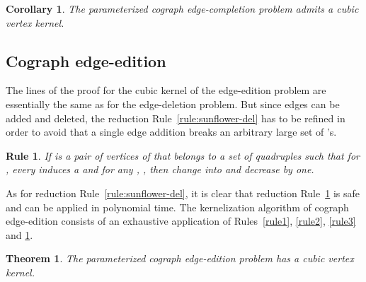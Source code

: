 \documentclass[11pt]{article}
\newtheorem{theorem}[lemma]{Theorem}
\newtheorem{corollary}[lemma]{Corollary}
\newtheorem{reduction}{Rule}
\begin{document}
 \begin{corollary}
The parameterized cograph edge-completion problem admits a cubic vertex kernel.
\end{corollary}

\subsection{Cograph edge-edition}

The lines of the proof for the cubic kernel of the edge-edition problem are essentially the same as for the edge-deletion problem. But since edges can be added and deleted, the reduction Rule~\ref{rule:sunflower-del} has to be refined in order to avoid that a single edge addition breaks an arbitrary large set of 's.

\begin{reduction} \label{rule:sunflower-edition}
If  is a pair of vertices of  that belongs to a set  of   quadruples  such that for , every  induces a  and for any , , then change  into  and decrease  by one.
\end{reduction}

As for reduction Rule~\ref{rule:sunflower-del}, it is clear that reduction Rule~\ref{rule:sunflower-edition} is safe and can be applied in polynomial time. The kernelization algorithm of cograph edge-edition consists of an exhaustive application of Rules~\ref{rule1}, \ref{rule2}, \ref{rule3} and \ref{rule:sunflower-edition}.

\begin{theorem}
\label{th:edition}
The parameterized cograph edge-edition problem has a cubic vertex kernel.
\end{theorem}
\end{document}
